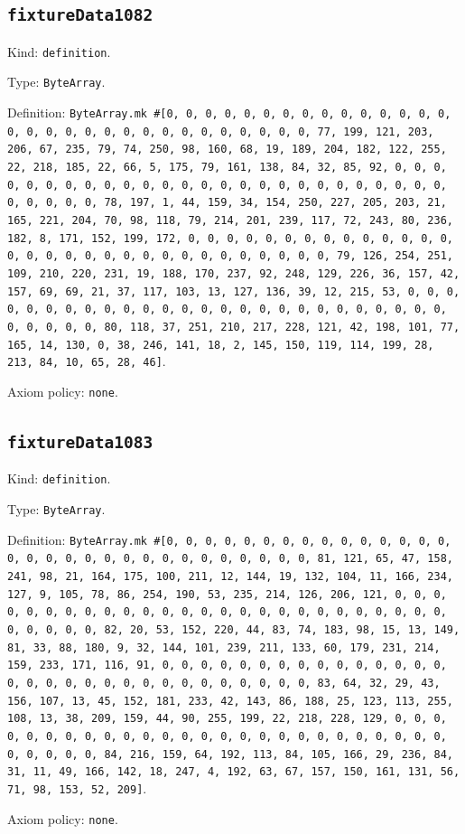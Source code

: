 \documentclass[11pt]{article}
\begin{document}
\subsection*{\texttt{fixtureData1082}}
\noindent Kind: \texttt{definition}.\par
\noindent Type: \texttt{ByteArray}.\par
\noindent Definition: \texttt{ByteArray.mk \#[0, 0, 0, 0, 0, 0, 0, 0, 0, 0, 0, 0, 0, 0, 0, 0, 0, 0, 0, 0, 0, 0, 0, 0, 0, 0, 0, 0, 0, 0, 0, 77, 199, 121, 203, 206, 67, 235, 79, 74, 250, 98, 160, 68, 19, 189, 204, 182, 122, 255, 22, 218, 185, 22, 66, 5, 175, 79, 161, 138, 84, 32, 85, 92, 0, 0, 0, 0, 0, 0, 0, 0, 0, 0, 0, 0, 0, 0, 0, 0, 0, 0, 0, 0, 0, 0, 0, 0, 0, 0, 0, 0, 0, 0, 0, 78, 197, 1, 44, 159, 34, 154, 250, 227, 205, 203, 21, 165, 221, 204, 70, 98, 118, 79, 214, 201, 239, 117, 72, 243, 80, 236, 182, 8, 171, 152, 199, 172, 0, 0, 0, 0, 0, 0, 0, 0, 0, 0, 0, 0, 0, 0, 0, 0, 0, 0, 0, 0, 0, 0, 0, 0, 0, 0, 0, 0, 0, 0, 0, 79, 126, 254, 251, 109, 210, 220, 231, 19, 188, 170, 237, 92, 248, 129, 226, 36, 157, 42, 157, 69, 69, 21, 37, 117, 103, 13, 127, 136, 39, 12, 215, 53, 0, 0, 0, 0, 0, 0, 0, 0, 0, 0, 0, 0, 0, 0, 0, 0, 0, 0, 0, 0, 0, 0, 0, 0, 0, 0, 0, 0, 0, 0, 0, 80, 118, 37, 251, 210, 217, 228, 121, 42, 198, 101, 77, 165, 14, 130, 0, 38, 246, 141, 18, 2, 145, 150, 119, 114, 199, 28, 213, 84, 10, 65, 28, 46]}.\par
\noindent Axiom policy: \texttt{none}.\par
\subsection*{\texttt{fixtureData1083}}
\noindent Kind: \texttt{definition}.\par
\noindent Type: \texttt{ByteArray}.\par
\noindent Definition: \texttt{ByteArray.mk \#[0, 0, 0, 0, 0, 0, 0, 0, 0, 0, 0, 0, 0, 0, 0, 0, 0, 0, 0, 0, 0, 0, 0, 0, 0, 0, 0, 0, 0, 0, 0, 81, 121, 65, 47, 158, 241, 98, 21, 164, 175, 100, 211, 12, 144, 19, 132, 104, 11, 166, 234, 127, 9, 105, 78, 86, 254, 190, 53, 235, 214, 126, 206, 121, 0, 0, 0, 0, 0, 0, 0, 0, 0, 0, 0, 0, 0, 0, 0, 0, 0, 0, 0, 0, 0, 0, 0, 0, 0, 0, 0, 0, 0, 0, 0, 82, 20, 53, 152, 220, 44, 83, 74, 183, 98, 15, 13, 149, 81, 33, 88, 180, 9, 32, 144, 101, 239, 211, 133, 60, 179, 231, 214, 159, 233, 171, 116, 91, 0, 0, 0, 0, 0, 0, 0, 0, 0, 0, 0, 0, 0, 0, 0, 0, 0, 0, 0, 0, 0, 0, 0, 0, 0, 0, 0, 0, 0, 0, 0, 83, 64, 32, 29, 43, 156, 107, 13, 45, 152, 181, 233, 42, 143, 86, 188, 25, 123, 113, 255, 108, 13, 38, 209, 159, 44, 90, 255, 199, 22, 218, 228, 129, 0, 0, 0, 0, 0, 0, 0, 0, 0, 0, 0, 0, 0, 0, 0, 0, 0, 0, 0, 0, 0, 0, 0, 0, 0, 0, 0, 0, 0, 0, 0, 84, 216, 159, 64, 192, 113, 84, 105, 166, 29, 236, 84, 31, 11, 49, 166, 142, 18, 247, 4, 192, 63, 67, 157, 150, 161, 131, 56, 71, 98, 153, 52, 209]}.\par
\noindent Axiom policy: \texttt{none}.\par
\end{document}
